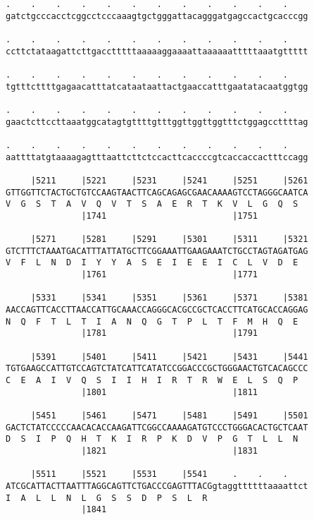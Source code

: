 \documentclass{article}
\begin{document}
\begin{Verbatim}
.    .    .    .    .    .    .    .    .    .    .    .    
gatctgcccacctcggcctcccaaagtgctgggattacagggatgagccactgcacccgg
                                                            
.    .    .    .    .    .    .    .    .    .    .    .    
ccttctataagattcttgacctttttaaaaaggaaaattaaaaaatttttaaatgttttt
                                                            
.    .    .    .    .    .    .    .    .    .    .    .    
tgtttcttttgagaacatttatcataataattactgaaccatttgaatatacaatggtgg
                                                            
.    .    .    .    .    .    .    .    .    .    .    .    
gaactcttccttaaatggcatagtgttttgtttggttggttggtttctggagccttttag
                                                            
.    .    .    .    .    .    .    .    .    .    .    .    
aattttatgtaaaagagtttaattcttctccacttcaccccgtcaccaccactttccagg
                                                            
     |5211     |5221     |5231     |5241     |5251     |5261
GTTGGTTCTACTGCTGTCCAAGTAACTTCAGCAGAGCGAACAAAAGTCCTAGGGCAATCA
V  G  S  T  A  V  Q  V  T  S  A  E  R  T  K  V  L  G  Q  S  
               |1741                         |1751          
  
     |5271     |5281     |5291     |5301     |5311     |5321
GTCTTTCTAAATGACATTTATTATGCTTCGGAAATTGAAGAAATCTGCCTAGTAGATGAG
V  F  L  N  D  I  Y  Y  A  S  E  I  E  E  I  C  L  V  D  E  
               |1761                         |1771          
  
     |5331     |5341     |5351     |5361     |5371     |5381
AACCAGTTCACCTTAACCATTGCAAACCAGGGCACGCCGCTCACCTTCATGCACCAGGAG
N  Q  F  T  L  T  I  A  N  Q  G  T  P  L  T  F  M  H  Q  E  
               |1781                         |1791          
  
     |5391     |5401     |5411     |5421     |5431     |5441
TGTGAAGCCATTGTCCAGTCTATCATTCATATCCGGACCCGCTGGGAACTGTCACAGCCC
C  E  A  I  V  Q  S  I  I  H  I  R  T  R  W  E  L  S  Q  P  
               |1801                         |1811          
  
     |5451     |5461     |5471     |5481     |5491     |5501
GACTCTATCCCCCAACACACCAAGATTCGGCCAAAAGATGTCCCTGGGACACTGCTCAAT
D  S  I  P  Q  H  T  K  I  R  P  K  D  V  P  G  T  L  L  N  
               |1821                         |1831          
  
     |5511     |5521     |5531     |5541     .    .    .    
ATCGCATTACTTAATTTAGGCAGTTCTGACCCGAGTTTACGgtaggttttttaaaattct
I  A  L  L  N  L  G  S  S  D  P  S  L  R                    
               |1841                                        
  

\end{Verbatim}
\end{document}
